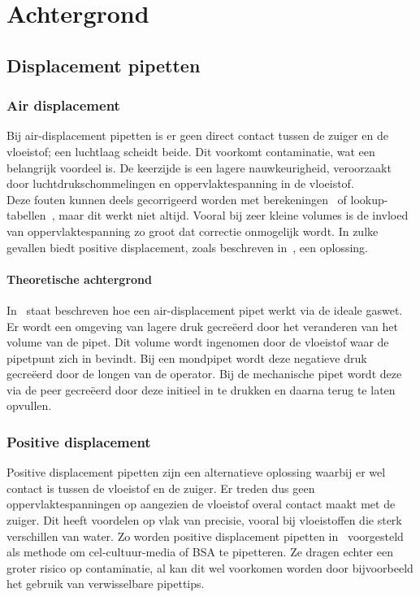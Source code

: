 \chapter{Achtergrond}


\section{Displacement pipetten}
\subsection{Air displacement}
Bij air-displacement pipetten is er geen direct contact tussen de zuiger en de vloeistof; een luchtlaag scheidt beide. Dit voorkomt contaminatie, wat een belangrijk voordeel is. De keerzijde is een lagere nauwkeurigheid, veroorzaakt door luchtdrukschommelingen en oppervlaktespanning in de vloeistof.
\\[12pt]Deze fouten kunnen deels gecorrigeerd worden met berekeningen\ \cite{RN15} of lookup-tabellen\ \cite{RN35}, maar dit werkt niet altijd. Vooral bij zeer kleine volumes is de invloed van oppervlaktespanning zo groot dat correctie onmogelijk wordt. In zulke gevallen biedt positive displacement, zoals beschreven in\ \cite{RN15}, een oplossing.
\subsubsection{Theoretische achtergrond}
In\ \cite{RN15} staat beschreven hoe een air-displacement pipet werkt via de ideale gaswet. Er wordt een omgeving van lagere druk gecreëerd door het veranderen van het volume van de pipet. Dit volume wordt ingenomen door de vloeistof waar de pipetpunt zich in bevindt. Bij een mondpipet wordt deze negatieve druk gecreëerd door de longen van de operator. Bij de mechanische pipet wordt deze via de peer gecreëerd door deze initieel in te drukken en daarna terug te laten opvullen.
\subsection{Positive displacement}
Positive displacement pipetten zijn een alternatieve oplossing waarbij er wel contact is tussen de vloeistof en de zuiger. Er treden dus geen oppervlaktespanningen op aangezien de vloeistof overal contact maakt met de zuiger. Dit heeft voordelen op vlak van precisie, vooral bij vloeistoffen die sterk verschillen van water. Zo worden positive displacement pipetten in\ \cite{RN37} voorgesteld als methode om cel-cultuur-media of BSA te pipetteren. Ze dragen echter een groter risico op contaminatie, al kan dit wel voorkomen worden door bijvoorbeeld het gebruik van verwisselbare pipettips.

